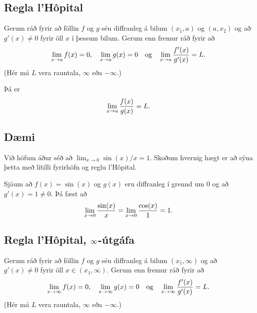\documentclass[a4paper,10pt,icelandic]{sphinxmanual}
\begin{document}
\subsection{Regla l’Hôpital}
\label{kafli03:id23}
Gerum ráð fyrir að föllin \(f\) og \(g\) séu diffranleg á bilum
\((x_1, a)\) og \((a, x_2)\) og að \(g'(x)\neq 0\) fyrir öll
\(x\) í þessum bilum.
Gerum enn fremur ráð fyrir að
\begin{gather}
\begin{split}\lim_{x\rightarrow a}f(x)=0, \quad \lim_{x\rightarrow a}g(x)=0
\quad\mbox{og}\quad \lim_{x\rightarrow a}\frac{f'(x)}{g'(x)}=L.\end{split}\notag
\end{gather}
(Hér má \(L\) vera rauntala, \(\infty\) eða \(-\infty\).)

Þá er
\begin{gather}
\begin{split}\lim_{x\rightarrow a}\frac{f(x)}{g(x)}=L.\end{split}\notag
\end{gather}

\subsection{Dæmi}
\label{kafli03:id24}
Við höfum áður séð að \(\lim_{x\to 0} \sin(x)/x = 1\).
Skoðum hvernig hægt er að sýna þetta með lítilli fyrirhöfn og reglu l’Hôpital.

Sjáum að \(f(x) = \sin(x)\) og \(g(x)\) eru diffranleg í grennd um 0
og að \(g'(x) = 1 \neq 0\). Þá fæst að
\begin{gather}
\begin{split}\lim_{x \to 0} \frac{\sin(x)}{x} = \lim_{x \to 0} \frac{\cos(x)}{1} = 1.\end{split}\notag
\end{gather}

\subsection{Regla l’Hôpital, \protect\(\infty\protect\)-útgáfa}
\label{kafli03:regla-lhopital-utgafa}
Gerum ráð fyrir að föllin \(f\) og \(g\) séu diffranleg á bilum
\((x_1, \infty)\) og að \(g'(x)\neq 0\) fyrir öll
\(x\in (x_1, \infty)\). Gerum enn fremur ráð fyrir að
\begin{gather}
\begin{split}\lim_{x\rightarrow \infty}f(x)=0, \quad \lim_{x\rightarrow \infty}g(x)=0
\quad\mbox{og}\quad \lim_{x\rightarrow \infty}\frac{f'(x)}{g'(x)}=L.\end{split}\notag
\end{gather}
(Hér má \(L\) vera rauntala, \(\infty\) eða \(-\infty\).)
\end{document}
